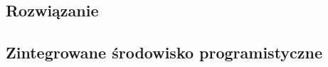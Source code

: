 \documentclass[11pt,a4paper,polish,thesis]{dcsbook}
\begin{document}
\subsection{Rozwiązanie}

\subsection{Zintegrowane środowisko programistyczne}


\end{document}
